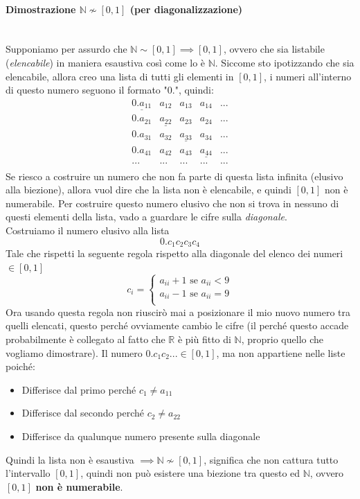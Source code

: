 \documentclass{article}
\begin{document}
\paragraph{Dimostrazione $\mathbb{N}\nsim[0,1]$ (per diagonalizzazione)}\mbox{}\\Supponiamo per assurdo che $\mathbb{N}\sim[0,1]\implies[0,1]$,
ovvero che sia listabile (\textit{elencabile}) in maniera esaustiva così come lo è $\mathbb{N}$.
Siccome sto ipotizzando che sia elencabile, allora creo una lista di tutti gli elementi in $[0,1]$, i numeri
all'interno di questo numero seguono il formato "$0.$", quindi:
\[
    \begin{array}{ccccc}
        \underline{0.a_{11}} & a_{12}             & a_{13}             & a_{14}             & ... \\
        0.a_{21}             & \underline{a_{22}} & a_{23}             & a_{24}             & ... \\
        0.a_{31}             & a_{32}             & \underline{a_{33}} & a_{34}             & ... \\
        0.a_{41}             & a_{42}             & a_{43}             & \underline{a_{44}} & ... \\
        ...                  & ...                  & ...                  & ...                  & ... \\
    \end{array}
\]
Se riesco a costruire un numero che non fa parte di questa lista infinita (elusivo alla biezione),
allora vuol dire che la lista non è elencabile, e quindi $[0,1]$ non è numerabile.
Per costruire questo numero elusivo che non si trova in nessuno di questi elementi della lista,
vado a guardare le cifre sulla \textit{diagonale}.\\Costruiamo il numero elusivo alla lista
$$0.c_1c_2c_3c_4$$
Tale che rispetti la seguente regola rispetto alla diagonale del elenco dei numeri $\in [0,1]$
\[
    c_i=
    \begin{cases}
        a_{ii} + 1\text{ se }a_{ii} < 9 \\
        a_{ii} - 1\text{ se }a_{ii} = 9 \\
    \end{cases}
\]
Ora usando questa regola non riuscirò mai a posizionare il mio nuovo numero
tra quelli elencati, questo perché ovviamente cambio le cifre (il perché questo accade
probabilmente è collegato al fatto che $\mathbb{R}$ è più fitto di $\mathbb{N}$, proprio
quello che vogliamo dimostrare).
Il numero $0.c_1c_2...\in[0,1]$, ma non appartiene nelle liste poiché:
\begin{itemize}
    \item Differisce dal primo perché $c_1\neq a_{11}$
    \item Differisce dal secondo perché $c_2\neq a_{22}$
    \item Differisce da qualunque numero presente sulla diagonale
\end{itemize}
Quindi la lista non è esaustiva $\implies \mathbb{N}\nsim[0,1]$, significa che non cattura tutto l'intervallo $[0,1]$,
quindi non può esistere una biezione tra questo ed $\mathbb{N}$, ovvero $[0,1]$ \textbf{non è numerabile}.
\end{document}
